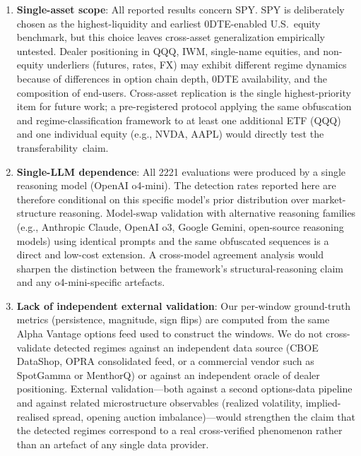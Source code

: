 \documentclass[jrfm,article,accept,moreauthors,pdftex]{Definitions/mdpi}
\begin{document}
\begin{enumerate}[leftmargin=*,labelsep=4.5mm]
\item \textbf{{Single-asset scope}}: %
 All reported results concern SPY.
SPY is deliberately chosen as the highest-liquidity and earliest 0DTE-enabled
U.S.\ equity benchmark, but this choice leaves cross-asset generalization
empirically untested. Dealer positioning in QQQ, IWM, single-name equities,
and non-equity underliers (futures, rates, FX) may exhibit different
regime dynamics because of differences in option chain depth, 0DTE
availability, and the composition of end-users. Cross-asset replication is
the single highest-priority item for future work; a pre-registered protocol
applying the same obfuscation and regime-classification framework to at
least one additional ETF (QQQ) and one individual equity (e.g., NVDA, AAPL)
would directly test the \mbox{transferability claim.}

\item \textbf{Single-LLM dependence}: All 2221 evaluations were
produced by a single reasoning model (OpenAI o4-mini). The detection
rates reported here are therefore conditional on this specific model's
prior distribution over market-structure reasoning. Model-swap
validation with alternative reasoning families
(e.g., Anthropic Claude, OpenAI o3, Google Gemini, open-source
reasoning models) using identical prompts and the same obfuscated
sequences is a direct and low-cost extension. A cross-model agreement
analysis would sharpen the distinction between the framework's
structural-reasoning claim and any o4-mini-specific artefacts.

\item \textbf{Lack of independent external validation}: Our per-window
ground-truth metrics (persistence, magnitude, sign flips) are computed
from the same Alpha Vantage options feed used to construct the windows.
We do not cross-validate detected regimes against an independent
data source (CBOE DataShop, OPRA consolidated feed, or a commercial
vendor such as SpotGamma or MenthorQ) or against an independent oracle
of dealer positioning. External validation---both against a second
options-data pipeline and against related microstructure observables
(realized volatility, implied-realised spread, opening auction
imbalance)---would strengthen the claim that the detected regimes
correspond to a real cross-verified phenomenon rather than an artefact
of any single data provider.


\end{enumerate}
\end{document}
